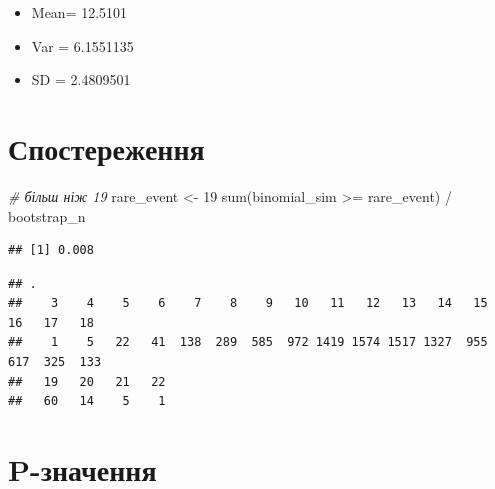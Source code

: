\documentclass[
  10pt,
]{article}
\newenvironment{Shaded}{\begin{snugshade}}{\end{snugshade}}
\newcommand{\CommentTok}[1]{\textcolor[rgb]{0.56,0.35,0.01}{\textit{#1}}}
\newcommand{\DecValTok}[1]{\textcolor[rgb]{0.00,0.00,0.81}{#1}}
\newcommand{\FunctionTok}[1]{\textcolor[rgb]{0.00,0.00,0.00}{#1}}
\newcommand{\NormalTok}[1]{#1}
\newcommand{\OtherTok}[1]{\textcolor[rgb]{0.56,0.35,0.01}{#1}}
\newcommand{\SpecialCharTok}[1]{\textcolor[rgb]{0.00,0.00,0.00}{#1}}
\providecommand{\tightlist}{%
  \setlength{\itemsep}{0pt}\setlength{\parskip}{0pt}}
\begin{document}
\begin{itemize}
\tightlist
\item
  Mean= 12.5101
\item
  Var = 6.1551135
\item
  SD = 2.4809501
\end{itemize}

\newpage

\hypertarget{ux441ux43fux43eux441ux442ux435ux440ux435ux436ux435ux43dux43dux44f}{%
\section{Спостереження}\label{ux441ux43fux43eux441ux442ux435ux440ux435ux436ux435ux43dux43dux44f}}

\begin{Shaded}
\begin{Highlighting}[]
\CommentTok{\# більш ніж 19}
\NormalTok{rare\_event }\OtherTok{\textless{}{-}} \DecValTok{19}
\FunctionTok{sum}\NormalTok{(binomial\_sim }\SpecialCharTok{\textgreater{}=}\NormalTok{ rare\_event) }\SpecialCharTok{/}\NormalTok{ bootstrap\_n}
\end{Highlighting}
\end{Shaded}

\begin{verbatim}
## [1] 0.008
\end{verbatim}

\begin{Shaded}
\end{Shaded}

\begin{verbatim}
## .
##    3    4    5    6    7    8    9   10   11   12   13   14   15   16   17   18 
##    1    5   22   41  138  289  585  972 1419 1574 1517 1327  955  617  325  133 
##   19   20   21   22 
##   60   14    5    1
\end{verbatim}

\newpage

\hypertarget{p-ux437ux43dux430ux447ux435ux43dux43dux44f}{%
\section{P-значення}\label{p-ux437ux43dux430ux447ux435ux43dux43dux44f}}
\end{document}
